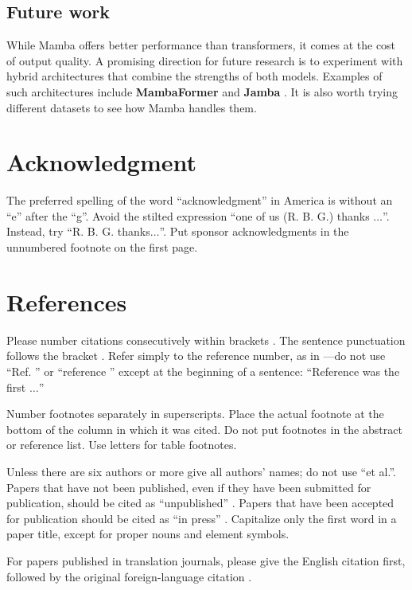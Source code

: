 \documentclass[conference]{IEEEtran}
\begin{document}
\subsection{Future work}
While Mamba offers better performance than transformers, it comes at the cost of output quality. A promising direction for future research is to experiment with hybrid architectures that combine the strengths of both models. Examples of such architectures include \textbf{MambaFormer} \cite{mambaformer} and \textbf{Jamba} \cite{jamba}. It is also worth trying different datasets to see how Mamba handles them.


\section*{Acknowledgment}

The preferred spelling of the word ``acknowledgment'' in America is without
an ``e'' after the ``g''. Avoid the stilted expression ``one of us (R. B.
G.) thanks $\ldots$''. Instead, try ``R. B. G. thanks$\ldots$''. Put sponsor
acknowledgments in the unnumbered footnote on the first page.

\section*{References}

Please number citations consecutively within brackets \cite{b1}. The
sentence punctuation follows the bracket \cite{b2}. Refer simply to the reference
number, as in \cite{b3}---do not use ``Ref. \cite{b3}'' or ``reference \cite{b3}'' except at
the beginning of a sentence: ``Reference \cite{b3} was the first $\ldots$''

Number footnotes separately in superscripts. Place the actual footnote at
the bottom of the column in which it was cited. Do not put footnotes in the
abstract or reference list. Use letters for table footnotes.

Unless there are six authors or more give all authors' names; do not use
``et al.''. Papers that have not been published, even if they have been
submitted for publication, should be cited as ``unpublished'' \cite{b4}. Papers
that have been accepted for publication should be cited as ``in press'' \cite{b5}.
Capitalize only the first word in a paper title, except for proper nouns and
element symbols.

For papers published in translation journals, please give the English
citation first, followed by the original foreign-language citation \cite{b6}.
\end{document}
